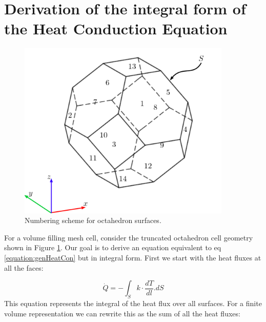 \documentclass[11pt,letterpaper,titlepage]{article}
\begin{document}
\newpage
{}
\section{Derivation of the integral form of the Heat Conduction Equation}
\begin{center}
	\begin{minipage}[c]{0.6\textwidth}
		\centering
		\begin{figure}[H]
		
			\includegraphics[width=4in]{OctahedronNumbers.png}
			\caption{Numbering scheme for octahedron surfaces.}
			\label{figure:OctahedronNumbers}
		\end{figure}
	\end{minipage}
\end{center}
For a volume filling mesh cell, consider the truncated octahedron cell geometry shown in Figure \ref{figure:OctahedronNumbers}. Our goal is to derive an equation equivalent to eq \ref{equation:genHeatCon} but in integral form. First we start with the heat fluxes at all the faces:

\begin{equation*}
\dot{Q}=-\int_S k\cdot \frac{dT}{dl}.dS
\end{equation*}
\newline
This equation represents the integral of the heat flux over all surfaces. For a finite volume representation we can rewrite this as the sum of all the heat fluxes:
\end{document}
